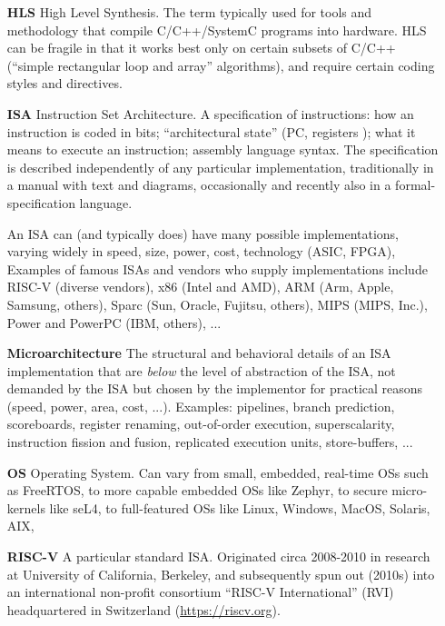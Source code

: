 \begin{itemize}
\item[\bf HLS] High Level Synthesis.  The term typically used for
  tools and methodology that compile C/C++/SystemC programs into
  hardware.  HLS can be fragile in that it works best only on certain
  subsets of C/C++ (``simple rectangular loop and array'' algorithms),
  and require certain coding styles and directives.

\item[\bf ISA] Instruction Set Architecture.  A specification of
  instructions: how an instruction is coded in bits; ``architectural
  state'' (PC, registers {\etc}); what it means to execute an
  instruction; assembly language syntax.  The specification is
  described independently of any particular implementation,
  traditionally in a manual with text and diagrams, occasionally and
  recently also in a formal-specification language.

  An ISA can (and typically does) have many possible implementations,
  varying widely in speed, size, power, cost, technology (ASIC, FPGA),
  {\etc} Examples of famous ISAs and vendors who supply
  implementations include RISC-V (diverse vendors), x86 (Intel and
  AMD), ARM (Arm, Apple, Samsung, others), Sparc (Sun, Oracle,
  Fujitsu, others), MIPS (MIPS, Inc.), Power and PowerPC (IBM,
  others), ...

\item[\bf Microarchitecture] The structural and behavioral details of
  an ISA implementation that are \emph{below} the level of abstraction
  of the ISA, {\ie} not demanded by the ISA but chosen by the
  implementor for practical reasons (speed, power, area, cost, ...).
  Examples: pipelines, branch prediction, scoreboards, register
  renaming, out-of-order execution, superscalarity, instruction
  fission and fusion, replicated execution units, store-buffers, ...

\item[\bf OS] Operating System.  Can vary from small, embedded,
  real-time OSs such as FreeRTOS, to more capable embedded OSs like
  Zephyr, to secure micro-kernels like seL4, to full-featured OSs like
  Linux, Windows, MacOS, Solaris, AIX, {\etc}

\item[\bf RISC-V] A particular standard ISA.  Originated circa
  2008-2010 in research at University of California, Berkeley, and
  subsequently spun out (2010s) into an international non-profit
  consortium ``RISC-V International'' (RVI) headquartered in
  Switzerland (\url{https://riscv.org}).


\end{itemize}

